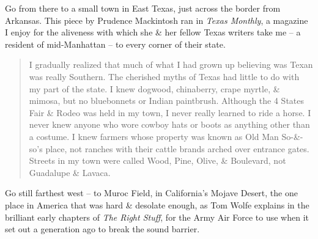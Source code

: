 \documentclass{article}
\begin{document}
Go from there to a small town in East Texas, just across the border from Arkansas. This piece by Prudence Mackintosh ran in \textit{Texas Monthly}, a magazine I enjoy for the aliveness with which she \& her fellow Texas writers take me -- a resident of mid-Manhattan -- to every corner of their state.
\begin{quotation}
	I gradually realized that much of what I had grown up believing was Texan was really Southern. The cherished myths of Texas had little to do with my part of the state. I knew dogwood, chinaberry, crape myrtle, \& mimosa, but no bluebonnets or Indian paintbrush. Although the 4 States Fair \& Rodeo was held in my town, I never really learned to ride a horse. I never knew anyone who wore cowboy hats or boots as anything other than a costume. I knew farmers whose property was known as Old Man So-\&-so's place, not ranches with their cattle brands arched over entrance gates. Streets in my town were called Wood, Pine, Olive, \& Boulevard, not Guadalupe \& Lavaca.
\end{quotation}
Go still farthest west -- to Muroc Field, in California's Mojave Desert, the one place in America that was hard \& desolate enough, as Tom Wolfe explains in the brilliant early chapters of \textit{The Right Stuff}, for the Army Air Force to use when it set out a generation ago to break the sound barrier.
\end{document}
